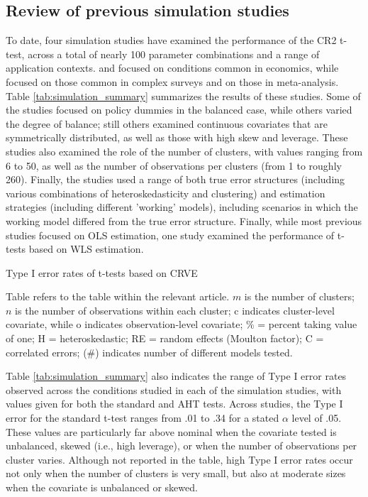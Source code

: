 \documentclass[12pt]{article}
\begin{document}
\subsection{Review of previous simulation studies}

To date, four simulation studies have examined the performance of the CR2 t-test, across a total of nearly 100 parameter combinations and a range of application contexts.
\citet{Cameron2015practitioners} and \citet{Imbens2015robust} focused on conditions common in economics, while \citet{Bell2002bias} focused on those common in complex surveys and \citet{Tipton2015small-t} on those in meta-analysis. 
Table \ref{tab:simulation_summary} summarizes the results of these studies.
Some of the studies focused on policy dummies in the balanced case, while others varied the degree of balance; still others examined continuous covariates that are symmetrically distributed, as well as those with high skew and leverage.
These studies also examined the role of the number of clusters, with values ranging from 6 to 50, as well as the number of observations per clusters (from 1 to roughly 260).
Finally, the studies used a range of both true error structures (including various combinations of heteroskedasticity and clustering) and estimation strategies (including different 'working' models), including scenarios in which the working model differed from the true error structure.
Finally, while most previous studies focused on OLS estimation, one study \citep{Tipton2015small-t} examined the performance of t-tests based on WLS estimation.

\begin{sidewaystable}
\small
\caption{Type I error rates of t-tests based on CRVE}
\label{tab:simulation_summary}

\caption*{Table refers to the table within the relevant article. $m$ is the number of clusters; $n$ is the number of observations within each cluster; c indicates cluster-level covariate, while o indicates observation-level covariate; \% = percent taking value of one; H = heteroskedastic; RE = random effects (Moulton factor); C = correlated errors; (\#) indicates number of different models tested.}
\end{sidewaystable}

Table \ref{tab:simulation_summary} also indicates the range of Type I error rates observed across the conditions studied in each of the simulation studies, with values given for both the standard and AHT tests.
Across studies, the Type I error for the standard t-test ranges from .01 to .34 for a stated $\alpha$ level of .05.
These values are particularly far above nominal when the covariate tested is unbalanced, skewed (i.e., high leverage), or when the number of observations per cluster varies. 
Although not reported in the table, high Type I error rates occur not only when the number of clusters is very small, but also at moderate sizes when the covariate is unbalanced or skewed. 
\end{document}
